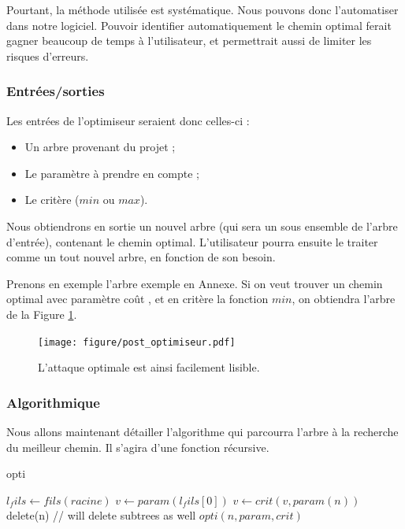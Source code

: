 		Pourtant, la méthode utilisée est systématique. Nous pouvons donc l'automatiser dans notre logiciel. Pouvoir identifier automatiquement le chemin optimal ferait gagner beaucoup de temps à l'utilisateur, et permettrait aussi de limiter les risques d'erreurs.

			\subsubsection{Entrées/sorties}
		Les entrées de l'optimiseur seraient donc celles-ci :
		\begin{itemize}
			\item Un arbre provenant du projet ;
			\item Le paramètre à prendre en compte ;
			\item Le critère ($min$ ou $max$).
		\end{itemize}

		Nous obtiendrons en sortie un nouvel arbre (qui sera un sous ensemble de l'arbre d'entrée), contenant le chemin optimal. 
		L'utilisateur pourra ensuite le traiter comme un tout nouvel arbre, en fonction de son besoin.

		Prenons en exemple l'arbre exemple en Annexe. %
		Si on veut trouver un chemin optimal avec paramètre \og coût \fg, et en critère la fonction $min$, on obtiendra l'arbre de la Figure \ref{fig:arbre_post_opti}.

		\begin{figure}[h!]
			\centering
				\texttt{[image: figure/post\_optimiseur.pdf]}
			\caption{L'attaque optimale est ainsi facilement lisible.}
			\label{fig:arbre_post_opti}
		\end{figure}

			\subsubsection{Algorithmique}
		Nous allons maintenant détailler l'algorithme qui parcourra l'arbre à la recherche du meilleur chemin. Il s'agira d'une fonction récursive.

		\begin{algorithm}[h!]
		\caption{opti}
		\begin{algorithmic}
			\STATE $l_fils \leftarrow fils(racine)$
				\RETURN
			\ENDIF
				\STATE $v \leftarrow param(l_fils[0])$
					\STATE $v \leftarrow crit(v, param(n))$
				\ENDFOR
						\STATE delete(n) // will delete subtrees as well
					\ENDIF
				\ENDFOR
			\ENDIF
				\STATE $opti(n, param, crit)$
			\ENDFOR

		\end{algorithmic}
		\end{algorithm}

